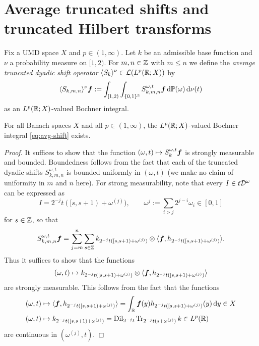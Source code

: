  \section{Average truncated shifts and truncated Hilbert transforms}{

\begin{defn}
  Fix a UMD space $X$ and $p \in (1,\infty)$.
  Let $k$ be an admissible base function and $\nu$ a probability measure on $[1,2)$.
  For $m,n \in \mathbb{Z}$ with $m \leq n$ we define the \emph{average truncated dyadic shift operator} $\langle S_k \rangle^{\nu} \in \mathcal{L}(L^p(\mathbb{R};X))$ by
  \begin{equation}\label{eq:avg-shift}
    \langle S_{k,m,n} \rangle^{\nu}\bm{f} := \int_{[1,2)} \int_{\{0,1\}^{\mathbb{Z}}} S_{k,m,n}^{\omega, t}\bm{f} \, \mathrm{d} \mathbb{P}(\omega) \, \mathrm{d} \nu(t)
  \end{equation}
  as an $L^p(\mathbb{R};X)$-valued Bochner integral.
\end{defn}

\begin{lem}
  For all Banach spaces $X$ and all $p \in (1,\infty)$, the $L^p(\mathbb{R};X)$-valued Bochner integral \eqref{eq:avg-shift} exists.
\end{lem}

\begin{proof}
It suffices to show that the function $(\omega,t) \mapsto S_{k}^{\omega, t}\bm{f}$ is strongly measurable and bounded.
Boundedness follows from the fact that each of the truncated dyadic shifts $S_{k,m,n}^{\omega,t}$ is bounded uniformly in $(\omega,t)$ (we make no claim of uniformity in $m$ and $n$ here).
For strong measurability, note that every $I \in t\mathcal{D}^{\omega}$ can be expressed as
\begin{equation}\label{eq:interval-parametrisation}
  I = 2^{-j}t([s,s+1) + \omega^{(j)}), \qquad \omega^{j} := \sum_{i > j} 2^{j-i} \omega_{i} \in [0,1]
\end{equation}
for $s \in \mathbb{Z}$, so that
\begin{equation*}
  S_{k,m,n}^{\omega, t}\bm{f} = \sum_{j = m}^{n} \sum_{s \in \mathbb{Z}} k_{2^{-j}t([s,s+1) + \omega^{(j)})} \otimes \langle \bm{f}, h_{2^{-j}t([s,s+1) + \omega^{(j)})} \rangle.
\end{equation*}
Thus it suffices to show that the functions
\begin{equation*}
  (\omega,t) \mapsto k_{2^{-j}t([s,s+1) + \omega^{(j)})} \otimes \langle \bm{f}, h_{2^{-j}t([s,s+1) + \omega^{(j)})} \rangle
\end{equation*}
are strongly measurable.
This follows from the fact that the functions
\begin{equation*}
  \begin{aligned}
    (\omega,t) &\mapsto \langle \bm{f}, h_{2^{-j}t([s,s+1) + \omega^{(j)})} \rangle = \int_{\mathbb{R}} \bm{f}(y) h_{2^{-j}t([s,s+1) + \omega^{(j)})}(y) \, \mathrm{d} y \in X\\
    (\omega,t) &\mapsto k_{2^{-j}t([s,s+1) + \omega^{(j)})} = \operatorname{Dil}_{2^{-j}t} \operatorname{Tr}_{2^{-j}t(s + \omega^{(j)})} k \in L^p(\mathbb{R})
\end{aligned}
\end{equation*}
are continuous in $(\omega^{(j)},t)$.
\end{proof}

}

